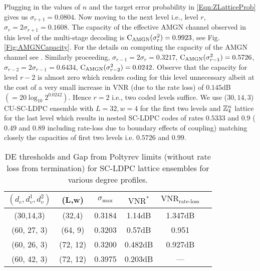 \documentclass[journal,draftcls,onecolumn,12pt,twoside]{IEEEtran}
\begin{document}
Plugging in the values of $n$ and the target error probability in \eqref{Eqn:ZLatticeProb} gives us $\sigma_{r+1}= 0.0804$. Now moving to the next level i.e., level $r$, $\sigma_{r}=2\sigma_{r+1}=0.1608$. The capacity of the effective AMGN channel observed in this level of the multi-stage decoding is $\text{C}_{\text{AMGN}}(\sigma^{2}_{r})=0.9923$, see Fig. \ref{Fig:AMGNCapacity}. For the details on computing the capacity of the AMGN channel see \cite{forney2000}.  Similarly proceeding, $\sigma_{r-1}=2\sigma_{r}=0.3217$, $\text{C}_{\text{AMGN}}(\sigma^{2}_{r-1})=0.5726$, $\sigma_{r-2}=2\sigma_{r-1}=0.6434$, $\text{C}_{\text{AMGN}}(\sigma^{2}_{r-2})=0.0242$. Observe that the capacity for level $r-2$ is almost zero which renders coding for this level unnecessary albeit at the cost of a very small increase in VNR (due to the rate loss) of $0.145$dB $(=20\log_{10}2^{0.0242})$. Hence $r=2$ i.e., two coded levels suffice. We use ($30,14,3$) CU-SC-LDPC ensemble with $L=32, w=4$ for the first two levels and $\mathbb{Z}_{4}^{n}$ lattice for the last level which results in nested SC-LDPC codes of rates $0.5333$ and $0.9$ ($0.49$ and $0.89$ including rate-loss due to boundary effects of coupling) matching closely the capacities of first two levels i.e. $0.5726$ and $0.99$.
\begin{table}
\centering
\caption{DE thresholds and Gap from Poltyrev limits (without rate loss from termination) for SC-LDPC lattice ensembles for various degree profiles.}
\begin{tabular}{c c c c c c}
\hline  \hline
$(d_{c},d_{v}^{1},d_{v}^{2})$ &(L,w)& $\sigma_{\text{max}}$ &$\text{VNR}^{*}$ &$\text{VNR}_{\text{rate-loss}}$\\
\hline
(30,14,3) & (32,4) & 0.3184 & 1.14dB & 1.347dB\\
(60, 27, 3)& (64, 9)  &  0.3203 & 0.57dB & 0.951\\
(60, 26, 3)& (72, 12) & 0.3200 &0.482dB & 0.927dB\\
(60, 42, 3)& (72, 12) & 0.3975 & 0.203dB &---\\
\end{tabular}
\label{Table:Thresholds}
\end{table}
\end{document}
